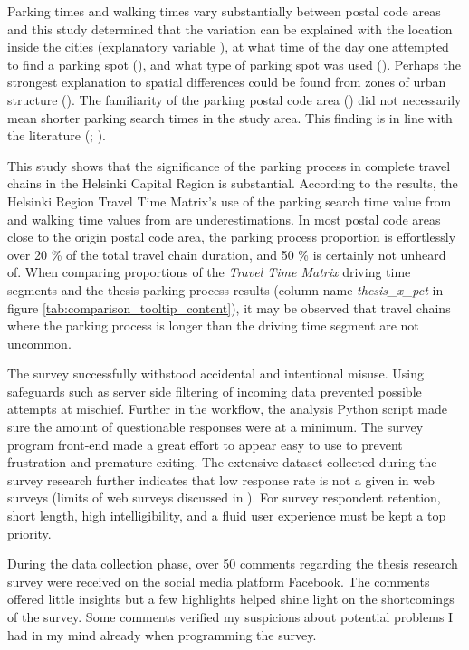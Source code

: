 Parking times and walking times vary substantially between postal code areas and this study determined that the variation can be explained with the location inside the cities (explanatory variable ), at what time of the day one attempted to find a parking spot (), and what type of parking spot was used (). Perhaps the strongest explanation to spatial differences could be found from zones of urban structure (). The familiarity of the parking postal code area () did not necessarily mean shorter parking search times in the study area. This finding is in line with the literature (\cite{Thompson1998}; \cite{Teng2002}).

This study shows that the significance of the parking process in complete travel chains in the Helsinki Capital Region is substantial. According to the results, the Helsinki Region Travel Time Matrix's use of the parking search time value from  and walking time values from  are underestimations. In most postal code areas close to the origin postal code area, the parking process proportion is effortlessly over 20 \% of the total travel chain duration, and 50 \% is certainly not unheard of. When comparing proportions of the \textit{Travel Time Matrix} driving time segments and the thesis parking process results (column name \textit{thesis\_x\_pct} in figure \ref{tab:comparison_tooltip_content}), it may be observed that travel chains where the parking process is longer than the driving time segment are not uncommon. 

The survey successfully withstood accidental and intentional misuse. Using safeguards such as server side filtering of incoming data prevented possible attempts at mischief. Further in the workflow, the analysis Python script made sure the amount of questionable responses were at a minimum. The survey program front-end made a great effort to appear easy to use to prevent frustration and premature exiting. The extensive dataset collected during the survey research further indicates that low response rate is not a given in web surveys (limits of web surveys discussed in ). For survey respondent retention, short length, high intelligibility, and a fluid user experience must be kept a top priority.

During the data collection phase, over 50 comments regarding the thesis research survey were received on the social media platform Facebook. The comments offered little insights but a few highlights helped shine light on the shortcomings of the survey. Some comments verified my suspicions about potential problems I had in my mind already when programming the survey.

